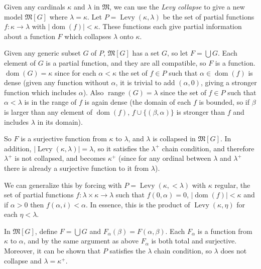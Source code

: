 \documentclass[12pt]{article}
\def\dom{\operatorname{dom}}
\def\Levy{\operatorname{Levy}}
\begin{document}
Given any cardinals $\kappa$ and $\lambda$ in $\mathfrak{M}$, we can use the \emph{Levy collapse} to give a new model $\mathfrak{M}[G]$ where $\lambda=\kappa$.  Let $P=\Levy(\kappa,\lambda)$ be the set of partial functions $f:\kappa\rightarrow\lambda$ with $|\dom(f)|<\kappa$.  These functions each give partial information about a function $F$ which collapses $\lambda$ onto $\kappa$.

Given any generic subset $G$ of $P$, $\mathfrak{M}[G]$ has a set $G$, so let $F=\bigcup G$.  Each element of $G$ is a partial function, and they are all compatible, so $F$ is a function.  $\dom(G)=\kappa$ since for each $\alpha<\kappa$ the set of $f\in P$ such that $\alpha\in\dom(f)$ is dense (given any function without $\alpha$, it is trivial to add $(\alpha,0)$, giving a stronger function which includes $\alpha$).  Also $\operatorname{range}(G)=\lambda$ since the set of $f\in P$ such that $\alpha<\lambda$ is in the range of $f$ is again dense (the domain of each $f$ is bounded, so if $\beta$ is larger than any element of $\dom(f)$, $f\cup\{(\beta,\alpha)\}$ is stronger than $f$ and includes $\lambda$ in its domain).

So $F$ is a surjective function from $\kappa$ to $\lambda$, and $\lambda$ is collapsed in $\mathfrak{M}[G]$.  In addition, $|\Levy(\kappa,\lambda)|=\lambda$, so it satisfies the $\lambda^+$ chain condition, and therefore $\lambda^+$ is not collapsed, and becomes $\kappa^+$ (since for any ordinal between $\lambda$ and $\lambda^+$ there is already a surjective function to it from $\lambda$).

We can generalize this by forcing with $P=\Levy(\kappa,<\lambda)$ with $\kappa$ regular, the set of partial functions $f:\lambda\times\kappa\rightarrow\lambda$ such that $f(0,\alpha)=0$, $|\dom(f)|<\kappa$ and if $\alpha>0$ then $f(\alpha,i)<\alpha$.  In essence, this is the product of $\Levy(\kappa,\eta)$ for each $\eta<\lambda$.

In $\mathfrak{M}[G]$, define $F=\bigcup G$ and $F_\alpha(\beta)=F(\alpha,\beta)$.  Each $F_\alpha$ is a function from $\kappa$ to $\alpha$, and by the same argument as above $F_\alpha$ is both total and surjective.  Moreover, it can be shown that $P$ satisfies the $\lambda$ chain condition, so $\lambda$ does not collapse and $\lambda=\kappa^+$.
\end{document}
